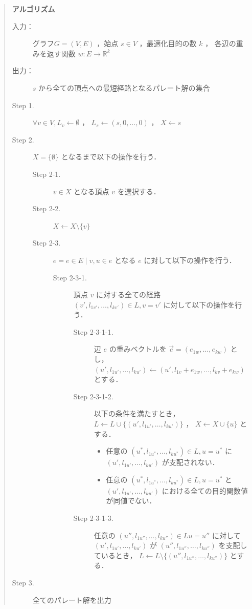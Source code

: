 \documentclass[12pt]{optlab-bachelor}
\begin{document}
\begin{quote}
  \textbf{アルゴリズム}
  \begin{description}
    \item[入力：] グラフ$G=(V,E)$ ，始点 $s \in V$ ，最適化目的の数 $k$ ，
    各辺の重みを返す関数 $w : E \to \mathbb{R}^k$
    \item[出力：] $s$ から全ての頂点への最短経路となるパレート解の集合
    \item[Step 1.] $\forall v \in V , L_v \leftarrow \emptyset$ ，
    $L_s \leftarrow (s,0,\ldots,0)$ ， $X \leftarrow s$
    \item[Step 2.] $X = \{\emptyset\}$ となるまで以下の操作を行う．
    \begin{description}
      \item[Step 2-1.] $v \in X$ となる頂点 $v$ を選択する．
      \item[Step 2-2.] $X \leftarrow X \setminus \{ v \}$
      \item[Step 2-3.] $e = {e \in E \mid v,u \in e}$ となる
      $e$ に対して以下の操作を行う．
      \begin{description}
        \item[Step 2-3-1.] 頂点 $v$ に対する全ての経路
        $(v',l_{1v'},\ldots,l_{kv'}) \in L,v=v'$ に対して以下の操作を行う．
        \begin{description}
          \item[Step 2-3-1-1.] 辺 $e$ の重みベクトルを
          $\vec{e} = (e_{1w},\ldots,e_{kw})$ とし，
          $(u',l_{1u'},\ldots,l_{ku'}) \leftarrow
          (u',l_{1v}+e_{1w},\ldots,l_{kv}+e_{kw})$ とする．
          \item[Step 2-3-1-2.] 以下の条件を満たすとき，
          $L \leftarrow L \cup \{(u',l_{1u'},\ldots,l_{ku'})\}$ ，
          $X \leftarrow X \cup \{ u\}$ とする．
          \begin{itemize}
            \item 任意の $(u^*,l_{1u^*},\ldots,l_{ku^*})\in L,u=u^*$ に
            $(u',l_{1u'},\ldots,l_{ku'})$ が支配されない．
            \item 任意の $(u^*,l_{1u^*},\ldots,l_{ku^*}) \in L,u=u^*$ と
            $(u',l_{1u'},\ldots,l_{ku'})$ における全ての目的関数値が同値でない．
          \end{itemize}
          \item[Step 2-3-1-3.] 任意の $(u'',l_{1u''},\ldots,l_{ku''})\in Lu=u''$
          に対して $(u',l_{1u'},\ldots,l_{ku'})$ が
          $(u'',l_{1u''},\ldots,l_{ku''})$ を支配しているとき，
          $L \leftarrow L \setminus \{(u'',l_{1u''},\ldots,l_{ku''})\}$ とする．
        \end{description}
      \end{description}
    \end{description}
    \item[Step 3.] 全てのパレート解を出力
  \end{description}
\end{quote}
\end{document}

